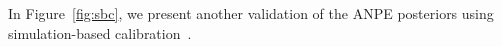 In Figure~\ref{fig:sbc}, we present another validation of the ANPE posteriors
using simulation-based calibration~\citep[SBC;][]{talts2020}. 


